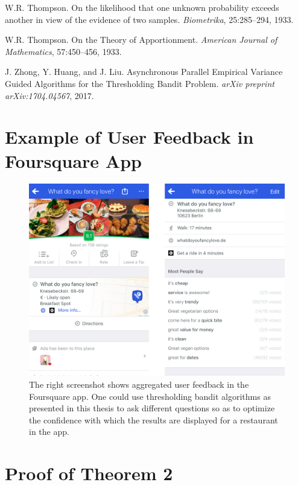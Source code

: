 \documentclass[11pt,]{article}
\begin{document}
W.R. Thompson. On the likelihood that one unknown probability exceeds
another in view of the evidence of two samples. \emph{Biometrika},
25:285--294, 1933.\par

W.R. Thompson. On the Theory of Apportionment. \emph{American Journal of
Mathematics}, 57:450--456, 1933.\par

J. Zhong, Y. Huang, and J. Liu. Asynchronous Parallel Empirical Variance
Guided Algorithms for the Thresholding Bandit Problem. \emph{arXiv
preprint arXiv:1704.04567}, 2017.\par

\newpage

\appendix

\section{Example of User Feedback in Foursquare App} \label{app:Foursquare}

\begin{figure}[htbp]
\centering
\includegraphics{figures/Foursquare_Screenshot.png}
\caption{The right screenshot shows aggregated user feedback in the
Foursquare app. One could use thresholding bandit algorithms as
presented in this thesis to ask different questions so as to optimize
the confidence with which the results are displayed for a restaurant in
the app.}
\end{figure}

\section{Proof of Theorem 2} \label{app:AppendixAPTLB}
\end{document}

